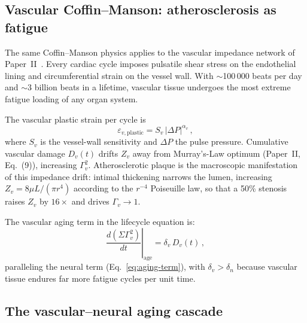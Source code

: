 ﻿\documentclass[aps,pre,twocolumn,superscriptaddress,floatfix]{revtex4-2}
\begin{document}
\subsection{Vascular Coffin--Manson: atherosclerosis as fatigue}
\label{sec:vascular-aging}

The same Coffin--Manson physics applies to the vascular
impedance network of Paper~II~\cite{PaperII}.
Every cardiac cycle imposes pulsatile shear stress on the
endothelial lining and circumferential strain on the
vessel wall.
With $\sim$100\,000 beats per day and $\sim$3 billion beats
in a lifetime, vascular tissue undergoes the most extreme
fatigue loading of any organ system.

The vascular plastic strain per cycle is
\begin{equation}
  \varepsilon_{v,\mathrm{plastic}} = S_v\,
    |\Delta P|^{\alpha_v}\,,
  \label{eq:vascular-pinch}
\end{equation}
where $S_v$ is the vessel-wall sensitivity and
$\Delta P$ the pulse pressure.
Cumulative vascular damage $D_v(t)$ drifts
$Z_v$ away from Murray's-Law optimum (Paper~II,
Eq.~(9)), increasing $\Gamma_v^2$.
Atherosclerotic plaque is the macroscopic manifestation
of this impedance drift: intimal thickening narrows
the lumen, increasing $Z_v = 8\mu L/(\pi r^4)$
according to the $r^{-4}$ Poiseuille law,
so that a 50\% stenosis raises $Z_v$ by $16\times$
and drives $\Gamma_v \to 1$.

The vascular aging term in the lifecycle equation is:
\begin{equation}
  \left.\frac{d(\Sigma\Gamma_v^2)}{dt}\right|_{\mathrm{age}}
    = \delta_v\,D_v(t)\,,
  \label{eq:vascular-aging-term}
\end{equation}
paralleling the neural term (Eq.~\eqref{eq:aging-term}),
with $\delta_v > \delta_n$ because vascular tissue
endures far more fatigue cycles per unit time.


\subsection{The vascular--neural aging cascade}
\label{sec:aging-cascade}
\end{document}
